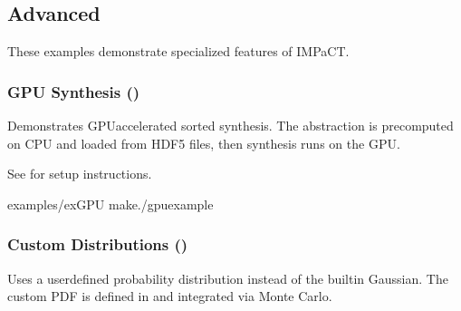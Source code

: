 \documentclass[a4paper,10pt,english]{sphinxmanual}
\begin{document}
\subsection{Advanced}
\label{\detokenize{examples/advanced:advanced}}\label{\detokenize{examples/advanced::doc}}
\sphinxAtStartPar
These examples demonstrate specialized features of IMPaCT.


\subsubsection{GPU Synthesis ()}
\label{\detokenize{examples/advanced:gpu-synthesis-ex-gpu}}
\sphinxAtStartPar
Demonstrates GPU\sphinxhyphen{}accelerated sorted synthesis. The abstraction is pre\sphinxhyphen{}computed
on CPU and loaded from HDF5 files, then synthesis runs on the GPU.

\sphinxAtStartPar
See {\hyperref[\detokenize{getting-started/gpu::doc}]{}} for setup instructions.

\sphinxAtStartPar
{}

\begin{sphinxVerbatim}[commandchars=\\\{\}]
examples/ex\PYGZus{}GPU
make./gpu\PYGZus{}example
\end{sphinxVerbatim}


\subsubsection{Custom Distributions ()}
\label{\detokenize{examples/advanced:custom-distributions-ex-custompdf}}
\sphinxAtStartPar
Uses a user\sphinxhyphen{}defined probability distribution instead of the built\sphinxhyphen{}in Gaussian.
The custom PDF is defined in  and integrated via Monte Carlo.

\sphinxAtStartPar
{}

\begin{sphinxVerbatim}[commandchars=\\\{\}]
\end{sphinxVerbatim}
\end{document}
